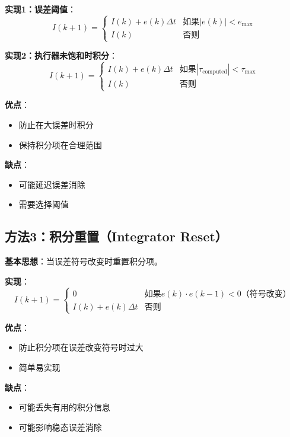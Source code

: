 \documentclass[12pt,a4paper]{article}
\begin{document}
\textbf{实现1：误差阈值}：
\begin{equation}
I(k+1) = \begin{cases}
I(k) + e(k) \Delta t & \text{如果} |e(k)| < e_{\max} \\
I(k) & \text{否则}
\end{cases}
\end{equation}

\textbf{实现2：执行器未饱和时积分}：
\begin{equation}
I(k+1) = \begin{cases}
I(k) + e(k) \Delta t & \text{如果} |\tau_{\text{computed}}| < \tau_{\max} \\
I(k) & \text{否则}
\end{cases}
\end{equation}

\textbf{优点}：
\begin{itemize}
\item 防止在大误差时积分
\item 保持积分项在合理范围
\end{itemize}

\textbf{缺点}：
\begin{itemize}
\item 可能延迟误差消除
\item 需要选择阈值
\end{itemize}

\subsection{方法3：积分重置（Integrator Reset）}

\textbf{基本思想}：当误差符号改变时重置积分项。

\textbf{实现}：
\begin{equation}
I(k+1) = \begin{cases}
0 & \text{如果} e(k) \cdot e(k-1) < 0 \text{（符号改变）} \\
I(k) + e(k) \Delta t & \text{否则}
\end{cases}
\end{equation}

\textbf{优点}：
\begin{itemize}
\item 防止积分项在误差改变符号时过大
\item 简单易实现
\end{itemize}

\textbf{缺点}：
\begin{itemize}
\item 可能丢失有用的积分信息
\item 可能影响稳态误差消除
\end{itemize}
\end{document}
